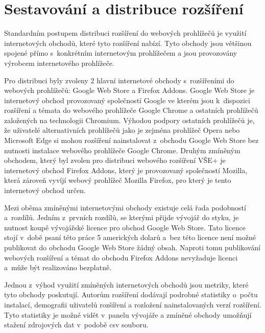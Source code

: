 \section{Sestavování a distribuce rozšíření}

Standardním postupem distribuci rozšíření do webových prohlížečů je využití internetových obchodů, které tyto rozšíření nabízí. Tyto obchody jsou většinou spojené přímo s~konkrétním internetovým prohlížečem a jsou provozovány výrobcem internetového prohlížeče. 

Pro distribuci byly zvoleny 2 hlavní internetové obchody s~rozšířeními do webových prohlížečů: Google Web Store a Firefox Addons. Google Web Store je internetový obchod provozovaný společností Google ve kterém jsou k~dispozici rozšíření a témata do webového prohlížeče Google Chrome a ostatních prohlížečů založených na technologii Chromium. 
Výhodou podpory ostatních prohlížečů je, že uživatelé alternativních prohlížečů jako je zejména prohlížeč Opera nebo Microsoft Edge si mohou rozšíření nainstalovat z~obchodu Google Web Store bez nutnosti instalace webového prohlížeče Google Chrome. Druhým zmíněným obchodem, který byl zvolen pro distribuci webového rozšíření VŠE+ je internetový obchod Firefox Addons, který je provozovaný společností Mozilla, která zároveň vyvíjí webový prohlížeč Mozilla Firefox, pro který je tento internetový obchod určen. 

Mezi oběma zmíněnými internetovými obchody existuje celá řada podobností a~rozdílů. Jedním z~prvních rozdílů, se kterými přijde vývojář do styku, je nutnost koupě vývojářské licence pro obchod Google Web Store. Tato licence stojí v~době psaní této práce 5 amerických dolarů a~bez této licence není možné publikovat do obchodu Google Web Store žádný obsah. Naproti tomu publikování webových rozšíření a témat do obchodu Firefox Addons nevyžaduje licenci a~může být realizováno bezplatně.       

Jednou z~výhod využití zmíněných internetových obchodů jsou metriky, které tyto obchody poskutují. Autorům rozšíření dodávají podrobné statistiky o~počtu instalací, demografii uživatelů rozšíření a rozložení nainstalovaných verzí rozšíření. Tyto statistiky je možné vidět v~panelu vývojáře a zmíněné obchody umožňují stažení zdrojových dat v~podobě csv souboru.

